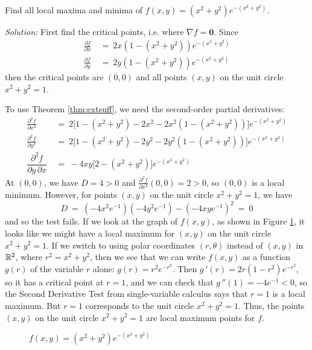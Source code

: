 \begin{exmp}
 Find all local maxima and minima of $f(x,y) = (x^2 + y^2 ) e^{-(x^2 + y^2 )}$.\vspace{1mm}
 \par\noindent\emph{Solution:} First find the critical points, i.e. where $\nabla f = \textbf{0}$. Since
 \begin{align*}
  \frac{\partial f}{\partial x} ~ &= ~ 2x(1 - (x^2 + y^2 )) e^{-(x^2 + y^2 )}\\[6pt]
  \frac{\partial f}{\partial y} ~ &= ~ 2y(1 - (x^2 + y^2 )) e^{-(x^2 + y^2 )}
 \end{align*}
 then the critical points are $(0,0)$ and all points $(x,y)$ on the unit circle $x^2 + y^2 = 1$.
 
 To use Theorem \ref{thm:extsuff}, we need the second-order partial derivatives:
 \begin{align*}
  \frac{\partial^2 f}{\partial x^2} ~ &= ~2\lbrack 1-(x^2 + y^2 )-2x^2-2x^2(1-(x^2 + y^2 ))\rbrack e^{-(x^2 + y^2 )}\\[6pt]
  \frac{\partial^2 f}{\partial y^2} ~ &= ~ 2\lbrack 1-(x^2 + y^2 )-2y^2-2y^2(1-(x^2 + y^2 ))\rbrack e^{-(x^2 + y^2 )}\\[6pt]
  \dfrac{\partial^2 f}{\partial y \, \partial x} ~ &= ~ -4xy\lbrack 2-(x^2 + y^2 ) \rbrack e^{-(x^2 + y^2 )}
 \end{align*}
 At $(0,0)$, we have $D = 4 > 0$ and $\frac{\partial^2 f}{\partial x^2}(0,0) = 2 > 0$, so $(0,0)$ is a local minimum.
 However, for points $(x,y)$ on the unit circle $x^2 + y^2 = 1$, we have
 \begin{displaymath}
  D ~=~ (-4x^2 e^{-1})(-4y^2 e^{-1}) - (-4xy e^{-1})^2 ~=~ 0
 \end{displaymath}
 and so the test fails. If we look at the graph of $f(x,y)$, as shown in Figure \ref{fig:er}, it looks like we might
 have a local maximum for $(x,y)$ on the unit circle $x^2 + y^2 = 1$.
If we switch to using polar coordinates $(r,\theta)$ instead of $(x,y)$ in $\mathbb{R}^{2}$, where $r^2 = x^2 + y^2$, then we
see that we can write $f(x,y)$ as a function $g(r)$ of the variable $r$ alone:
$g(r) = r^2 e^{-r^2}$. Then $g\,'(r) = 2r(1-r^2 ) e^{-r^2}$, so it has a critical point at $r=1$, and we can check that
$g\,''(1) = -4 e^{-1} < 0$, so the Second Derivative Test from single-variable calculus says that $r=1$ is a local
maximum. But $r=1$ corresponds to the unit circle $x^2 + y^2 = 1$. Thus, the points $(x,y)$ on the unit circle
$x^2 + y^2 = 1$ are local maximum points for $f$.
\newpage
\begin{figure}[h]\vspace{-18mm}
 \begin{center}
  
 \end{center}\vspace{-12mm}
 \caption[]{\quad $f(x,y) = (x^2 + y^2 ) e^{-(x^2 + y^2 )}$}
 \label{fig:er}
\end{figure}
\end{exmp}\vspace{-8mm}
